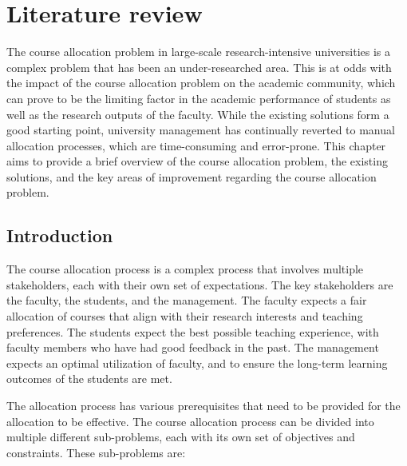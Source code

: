 \chapter{Literature review}


The course allocation problem in large-scale research-intensive universities is a complex problem that has been an under-researched area. This is at odds with the impact of the course allocation problem on the academic community, which can prove to be the limiting factor in the academic performance of students as well as the research outputs of the faculty. While the existing solutions form a good starting point, university management has continually reverted to manual allocation processes, which are time-consuming and error-prone. This chapter aims to provide a brief overview of the course allocation problem, the existing solutions, and the key areas of improvement regarding the course allocation problem.

\section{Introduction}

The course allocation process is a complex process that involves multiple stakeholders, each with their own set of expectations. The key stakeholders are the faculty, the students, and the management. The faculty expects a fair allocation of courses that align with their research interests and teaching preferences. The students expect the best possible teaching experience, with faculty members who have had good feedback in the past. The management expects an optimal utilization of faculty, and to ensure the long-term learning outcomes of the students are met.

The allocation process has various prerequisites that need to be provided for the allocation to be effective. The course allocation process can be divided into multiple different sub-problems, each with its own set of objectives and constraints. These sub-problems are:

